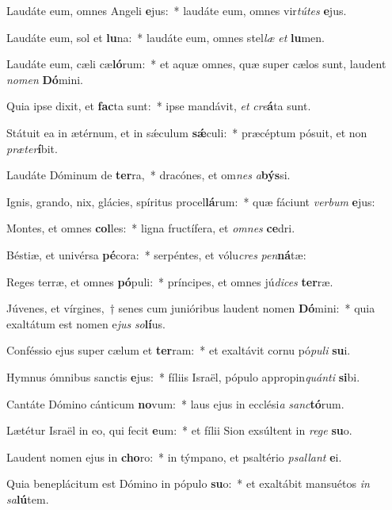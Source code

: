 \item Laudáte eum, omnes Angeli \textbf{e}jus:~* laudáte eum, omnes vir\textit{tú}\textit{tes} \textbf{e}jus.
\item Laudáte eum, sol et \textbf{lu}na:~* laudáte eum, omnes stel\textit{læ} \textit{et} \textbf{lu}men.
\item Laudáte eum, cæli cæ\textbf{ló}rum:~* et aquæ omnes, quæ super cælos sunt, laudent \textit{no}\textit{men} \textbf{Dó}mini.
\item Quia ipse dixit, et \textbf{fac}ta sunt:~* ipse mandávit, \textit{et} \textit{cre}\textbf{á}ta sunt.
\item Státuit ea in ætérnum, et in sǽculum \textbf{sǽ}culi:~* præcéptum pósuit, et non \textit{præ}\textit{ter}\textbf{í}bit.
\item Laudáte Dóminum de \textbf{ter}ra,~* dracónes, et om\textit{nes} \textit{a}\textbf{býs}si.
\item Ignis, grando, nix, glácies, spíritus procel\textbf{lá}rum:~* quæ fáciunt \textit{ver}\textit{bum} \textbf{e}jus:
\item Montes, et omnes \textbf{col}les:~* ligna fructífera, et \textit{om}\textit{nes} \textbf{ce}dri.
\item Béstiæ, et univérsa \textbf{pé}cora:~* serpéntes, et vólu\textit{cres} \textit{pen}\textbf{ná}tæ:
\item Reges terræ, et omnes \textbf{pó}puli:~* príncipes, et omnes jú\textit{di}\textit{ces} \textbf{ter}ræ.
\item Júvenes, et vírgines,~† senes cum junióribus laudent nomen \textbf{Dó}mini:~* quia exaltátum est nomen e\textit{jus} \textit{so}\textbf{lí}us.
\item Conféssio ejus super cælum et \textbf{ter}ram:~* et exaltávit cornu pó\textit{pu}\textit{li} \textbf{su}i.
\item Hymnus ómnibus sanctis \textbf{e}jus:~* fíliis Israël, pópulo appropin\textit{quán}\textit{ti} \textbf{si}bi.
\item Cantáte Dómino cánticum \textbf{no}vum:~* laus ejus in ecclési\textit{a} \textit{sanc}\textbf{tó}rum.
\item Lætétur Israël in eo, qui fecit \textbf{e}um:~* et fílii Sion exsúltent in \textit{re}\textit{ge} \textbf{su}o.
\item Laudent nomen ejus in \textbf{cho}ro:~* in týmpano, et psaltério \textit{psal}\textit{lant} \textbf{e}i.
\item Quia beneplácitum est Dómino in pópulo \textbf{su}o:~* et exaltábit mansuétos \textit{in} \textit{sa}\textbf{lú}tem.
